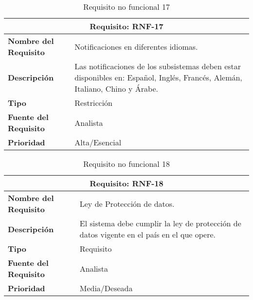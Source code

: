 \begin{table}[H]
\begin{center}
\begin{tabular}{p{} p{7cm}}
\multicolumn{2}{c}{\textbf{Requisito: RNF-17} } \\
\hline \hline
\textbf{Nombre del Requisito} & Notificaciones en diferentes idiomas.\\
\hline
\textbf{Descripción} & Las notificaciones de los subsistemas deben estar disponibles en: Español, Inglés, Francés, Alemán, Italiano, Chino y Árabe.\\
\hline
\textbf{Tipo} & Restricción  \\
\hline
\textbf{Fuente del Requisito} & Analista  \\
\hline
\textbf{Prioridad} & Alta/Esencial \\ \hline
\end{tabular}
\caption{Requisito no funcional 17}
\label{tab:RNF-17}
\end{center}
\end{table}

\begin{table}[H]
\begin{center}
\begin{tabular}{p{} p{7cm}}
\multicolumn{2}{c}{\textbf{Requisito: RNF-18} } \\
\hline \hline
\textbf{Nombre del Requisito} & Ley de Protección de datos.\\
\hline
\textbf{Descripción} & El sistema debe cumplir la ley de protección de datos vigente en el país en el que opere.\\
\hline
\textbf{Tipo} & Requisito  \\
\hline
\textbf{Fuente del Requisito} & Analista  \\
\hline
\textbf{Prioridad} & Media/Deseada \\ \hline
\end{tabular}
\caption{Requisito no funcional 18}
\label{tab:RNF-18}
\end{center}
\end{table}
